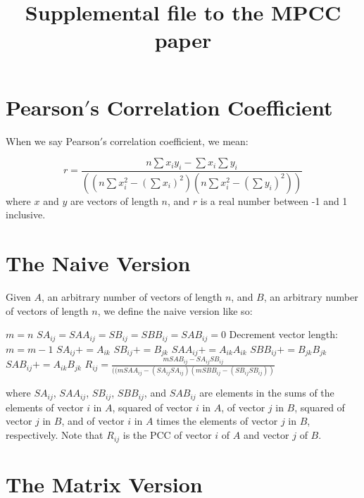 \documentclass{bioinfo}
\begin{document}
\title[Supplemental file 1]{Supplemental file to the MPCC paper}

\section{Pearson$'$s Correlation Coefficient}
When we say Pearson$'$s correlation coefficient, we mean:

\begin{equation}
r=\frac{n\sum x_iy_i-\sum x_i\sum y_i}{((n\sum x_i^2-(\sum x_i)^2)(n\sum x_i^2-(\sum y_i)^2))}
\end{equation}
where $x$ and $y$ are vectors of length $n$, and $r$ is a real number between -1 and 1 inclusive.

\section{The Naive Version}

Given $A$, an arbitrary number of vectors of length $n$, and $B$, an arbitrary number of vectors of length $n$, 
we define the naive version like so:

\begin{algorithmic}[1]
    \STATE $m=n$
    \STATE $SA_{ij}=SAA_{ij}=SB_{ij}=SBB_{ij}=SAB_{ij}=0$
        \STATE Decrement vector length: $m=m-1$
      \ELSE
        \STATE $SA_{ij}+=A_{ik}$
        \STATE $SB_{ij}+=B_{jk}$
        \STATE $SAA_{ij}+=A_{ik}A_{ik}$
        \STATE $SBB_{ij}+=B_{jk}B_{jk}$
        \STATE $SAB_{ij}+=A_{ik}B_{jk}$
      \ENDIF
    \ENDFOR 
    \STATE $R_{ij}=\frac{mSAB_{ij}-SA_{ij}SB_{ij}}{((mSAA_{ij}-(SA_{ij}SA_{ij})(mSBB_{ij}-(SB_{ij}SB_{ij}))}$
  \ENDFOR
\ENDFOR
\end{algorithmic}

\noindent where 
$SA_{ij}$,
$SAA_{ij}$, 
$SB_{ij}$, 
$SBB_{ij}$, and $SAB_{ij}$ 
are elements in the sums of the elements 
of vector $i$ in $A$, 
squared of vector $i$ in $A$, 
of vector $j$ in $B$, 
squared of vector $j$ in $B$, and
of vector $i$ in $A$ times the  elements of vector $j$ in $B$, respectively.
Note that $R_{ij}$ is the PCC of vector $i$ of $A$ and vector $j$ of $B$.

\section{The Matrix Version}
\end{document}

